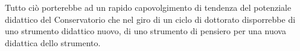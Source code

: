 \documentclass{gs-adonis}
\begin{document}
Tutto ciò porterebbe ad un rapido capovolgimento di tendenza del potenziale
didattico del Conservatorio che nel giro di un ciclo di dottorato disporrebbe
di uno strumento didattico nuovo, di uno strumento di pensiero per una nuova
didattica dello strumento.



\clearpage
\raggedright
\nocite{*}
%
\printbibliography
\end{document}
